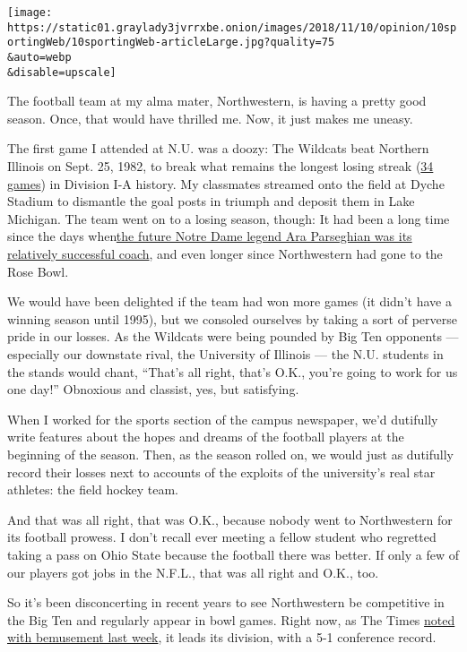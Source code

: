 \texttt{[image: https://static01.graylady3jvrrxbe.onion/images/2018/11/10/opinion/10sportingWeb/10sportingWeb-articleLarge.jpg?quality=75\\\&auto=webp\\\&disable=upscale]}

The football team at my alma mater, Northwestern, is having a pretty
good season. Once, that would have thrilled me. Now, it just makes me
uneasy.

The first game I attended at N.U. was a doozy: The Wildcats beat
Northern Illinois on Sept. 25, 1982, to break what remains the longest
losing streak
(\href{http://www.espn.com/page2/s/list/colfootball/teams/worst.html}{34
games}) in Division I-A history. My classmates streamed onto the field
at Dyche Stadium to dismantle the goal posts in triumph and deposit them
in Lake Michigan. The team went on to a losing season, though: It had
been a long time since the days
when\href{http://exhibits.library.northwestern.edu/archives/exhibits/football/7.html}{the
future Notre Dame legend Ara Parseghian was its relatively successful
coach}, and even longer since Northwestern had gone to the Rose Bowl.

We would have been delighted if the team had won more games (it didn't
have a winning season until 1995), but we consoled ourselves by taking a
sort of perverse pride in our losses. As the Wildcats were being pounded
by Big Ten opponents --- especially our downstate rival, the University
of Illinois --- the N.U. students in the stands would chant, ``That's
all right, that's O.K., you're going to work for us one day!'' Obnoxious
and classist, yes, but satisfying.

When I worked for the sports section of the campus newspaper, we'd
dutifully write features about the hopes and dreams of the football
players at the beginning of the season. Then, as the season rolled on,
we would just as dutifully record their losses next to accounts of the
exploits of the university's real star athletes: the field hockey team.

And that was all right, that was O.K., because nobody went to
Northwestern for its football prowess. I don't recall ever meeting a
fellow student who regretted taking a pass on Ohio State because the
football there was better. If only a few of our players got jobs in the
N.F.L., that was all right and O.K., too.

So it's been disconcerting in recent years to see Northwestern be
competitive in the Big Ten and regularly appear in bowl games. Right
now, as The Times
\href{https://www.nytimes3xbfgragh.onion/2018/10/30/sports/college-football-playoff.html}{noted
with bemusement last week}, it leads its division, with a 5-1 conference
record.

